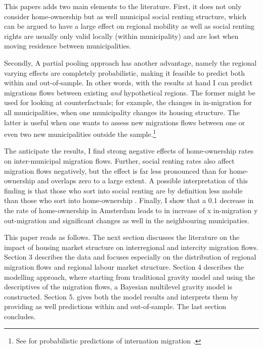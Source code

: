 \documentclass[12pt, parskip, abstracton,notitlepage]{scrartcl}
\begin{document}
This papers adds two main elements to the
literature. First, it does not only consider home-ownership
but as well municipal social renting structure, which can be
argued \citep[see, e.g.,][]{boyle1998migration, hughes1981council} to have a large effect on regional mobility as well as
social renting rights are usually only valid locally (within
municipality) and are lost when moving residence between
municipalities.

Secondly, A partial pooling approach has another advantage, namely the
regional varying effects are completely probabilistic, making
it feasible to predict both within and out-of-sample. In other
words, with the results at hand I can predict migrations flows between
existing \emph{and} hypothetical regions. The former might be used for looking at counterfactuals; for example, the changes in in-migration for all municipalities, when one municipality changes its housing structure. The latter is useful when one wants to assess new migrations flows between one or even two new municipalities outside the sample.\footnote{See for probabilistic predictions of internation migration \cite{azose2015bayesian}.}

The anticipate the results, I find strong negative effects of home-ownership rates on inter-municipal migration flows. Further, social renting rates also affect migration flows negatively, but the effect is far less pronounced than for home-ownership and overlaps zero to a large extent. A possible interpretation of this finding is that those who sort into social renting are by definition less mobile than those who sort into home-ownership \citep[this argument is put forward by][as well]{boyle1998migration}. Finally, I show that a 0.1 decrease in the rate of home-ownership in Amsterdam leads to in increase of x in-migration y out-migration and significant changes as well in the neighbouring municipaties. 

This paper reads as follows. The next section discusses the literature on the impact of housing market structure on interregional and intercity migration flows. Section 3 describes the
data and focuses especially on the distribution of regional
migration flows and regional labour market structure. Section
4 describes the modelling approach, where starting from
traditional gravity model and using the descriptives of the
migration flows, a Bayesian multilevel gravity model is constructed. Section
5. gives both the model results and interprets them by providing as well predictions within and
out-of-sample. The last section concludes.
\end{document}
